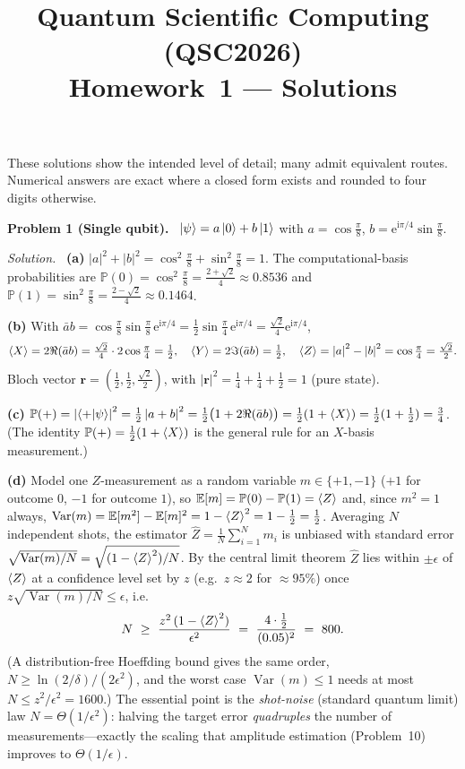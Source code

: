 \documentclass[11pt]{article}
\title{\textbf{Quantum Scientific Computing (QSC2026)}\\[0.3em]\large Homework~1 --- Solutions}
\author{}
\date{}
\newcommand{\E}{\mathbb{E}}
\newcommand{\Prob}{\mathbb{P}}
\newcommand{\ii}{\mathrm{i}}
\newcommand{\ee}{\mathrm{e}}
\DeclareMathOperator{\Var}{Var}
\newcommand{\abs}[1]{\left\lvert #1 \right\rvert}
\newcommand{\sol}{\smallskip\noindent\textit{Solution.}\ }
\newcommand{\problem}[1]{\bigskip\noindent\textbf{Problem #1.}\ }
\begin{document}
\maketitle
\vspace{-2.4em}
\noindent\small These solutions show the intended level of detail; many admit
equivalent routes. Numerical answers are exact where a closed form exists and
rounded to four digits otherwise.
\normalsize

\problem{1 (Single qubit)}
$\ket{\psi}=a\ket0+b\ket1$ with $a=\cos\tfrac\pi8$, $b=\ee^{\ii\pi/4}\sin\tfrac\pi8$.

\sol
\textbf{(a)} $\abs a^2+\abs b^2=\cos^2\tfrac\pi8+\sin^2\tfrac\pi8=1$. The
computational-basis probabilities are
$\Prob(0)=\cos^2\tfrac\pi8=\tfrac{2+\sqrt2}{4}\approx0.8536$ and
$\Prob(1)=\sin^2\tfrac\pi8=\tfrac{2-\sqrt2}{4}\approx0.1464$.

\textbf{(b)} With $\bar a b=\cos\tfrac\pi8\sin\tfrac\pi8\,\ee^{\ii\pi/4}
=\tfrac12\sin\tfrac\pi4\,\ee^{\ii\pi/4}=\tfrac{\sqrt2}{4}\ee^{\ii\pi/4}$,
\[
 \braket{X}=2\Re(\bar a b)=\tfrac{\sqrt2}{4}\cdot 2\cos\tfrac\pi4=\tfrac12,\quad
 \braket{Y}=2\Im(\bar a b)=\tfrac12,\quad
 \braket{Z}=\abs a^2-\abs b^2=\cos\tfrac\pi4=\tfrac{\sqrt2}{2}.
\]
Bloch vector $\mathbf r=(\tfrac12,\tfrac12,\tfrac{\sqrt2}{2})$, with
$\abs{\mathbf r}^2=\tfrac14+\tfrac14+\tfrac12=1$ (pure state).

\textbf{(c)} $\Prob(+)=\abs{\braket{+|\psi}}^2=\tfrac12\abs{a+b}^2
=\tfrac12\bigl(1+2\Re(\bar a b)\bigr)=\tfrac12(1+\braket{X})=\tfrac12(1+\tfrac12)=\tfrac34$.
(The identity $\Prob(+)=\tfrac12(1+\braket{X})$ is the general rule for an $X$-basis
measurement.)

\textbf{(d)} Model one $Z$-measurement as a random variable $m\in\{+1,-1\}$ ($+1$ for
outcome $0$, $-1$ for outcome $1$), so $\E[m]=\Prob(0)-\Prob(1)=\braket{Z}$ and, since
$m^2=1$ always, $\Var(m)=\E[m^2]-\E[m]^2=1-\braket{Z}^2=1-\tfrac12=\tfrac12$. Averaging
$N$ independent shots, the estimator $\hat Z=\tfrac1N\sum_{i=1}^N m_i$ is unbiased with
standard error $\sqrt{\Var(m)/N}=\sqrt{(1-\braket{Z}^2)/N}$. By the central limit
theorem $\hat Z$ lies within $\pm\epsilon$ of $\braket{Z}$ at a confidence level set by
$z$ (e.g.\ $z\approx2$ for $\approx95\%$) once $z\sqrt{\Var(m)/N}\le\epsilon$, i.e.
\[
 N\ \ge\ \frac{z^2\,(1-\braket{Z}^2)}{\epsilon^2}
 \ =\ \frac{4\cdot\tfrac12}{(0.05)^2}\ =\ 800 .
\]
(A distribution-free Hoeffding bound gives the same order,
$N\ge\ln(2/\delta)/(2\epsilon^2)$, and the worst case $\Var(m)\le1$ needs at most
$N\le z^2/\epsilon^2=1600$.) The essential point is the \emph{shot-noise} (standard
quantum limit) law $N=\Theta(1/\epsilon^2)$: halving the target error \emph{quadruples}
the number of measurements---exactly the scaling that amplitude estimation
(Problem~10) improves to $\Theta(1/\epsilon)$.
\end{document}
